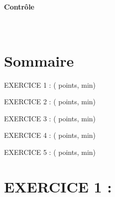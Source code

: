 \documentclass[11pt,a4paper]{article}
\newcommand{\MaybeLine}[1]{\if\relax\detokenize{#1}\relax\else #1\\\fi}
\newcommand{\MaybeBoldLine}[1]{\if\relax\detokenize{#1}\relax\else \textbf{#1}\\\fi}
\providecommand{\ecoleLigneUn}{}\providecommand{\ecoleLigneDeux}{}\providecommand{\ecoleLigneTrois}{}
\providecommand{\titreDevoir}{Contrôle}\providecommand{\sousTitreUn}{}\providecommand{\sousTitreDeux}{}
\renewcommand{\ecoleLigneUn}{  }%
\renewcommand{\ecoleLigneDeux}{  }%
\renewcommand{\ecoleLigneTrois}{  }%
\renewcommand{\titreDevoir}{ Contrôle }%
\renewcommand{\sousTitreUn}{  }%
\renewcommand{\sousTitreDeux}{  }%
\providecommand{\baremeGlobal}{20}
\renewcommand{\baremeGlobal}{ 20 }%
\newcommand{\baremeGlobal}{ 20 }
\begin{document}
\begin{minipage}[t]{0.25\textwidth}
    \begin{center}
      \MaybeBoldLine{\ecoleLigneUn}
      \MaybeLine{\ecoleLigneDeux}
      \MaybeLine{\ecoleLigneTrois}
    \end{center}
\end{minipage}
\hfill
\begin{minipage}[t]{0.5\textwidth}
    \begin{center}
        \Large\textbf{\titreDevoir}\\[0.5cm]
        \MaybeLine{\sousTitreUn}
        \MaybeLine{\sousTitreDeux}
    \end{center}
\end{minipage}
\hfill
\begin{minipage}[t]{0.25\textwidth}
\end{minipage}

\vspace{1cm}


\section*{Sommaire}

EXERCICE 1 :  ( points,  min)

EXERCICE 2 :  ( points,  min)

EXERCICE 3 :  ( points,  min)

EXERCICE 4 :  ( points,  min)

EXERCICE 5 :  ( points,  min)

\vspace{0.5cm}



\section*{EXERCICE 1 : }


\begin{minipage}[t]{0.9\textwidth}


\end{minipage}
\end{document}
